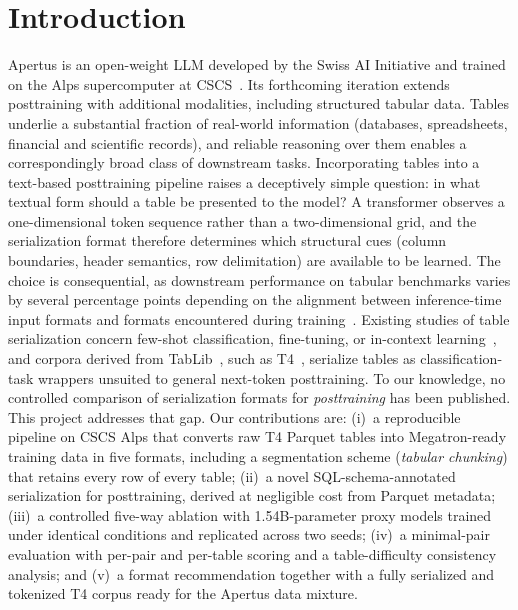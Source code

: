 \documentclass[11pt,a4paper]{article}
\begin{document}
\section{Introduction}
Apertus is an open-weight LLM developed by the Swiss AI Initiative and trained on the Alps supercomputer at CSCS~\cite{apertus}. Its forthcoming iteration extends posttraining with additional modalities, including structured tabular data. Tables underlie a substantial fraction of real-world information (databases, spreadsheets, financial and scientific records), and reliable reasoning over them enables a correspondingly broad class of downstream tasks.
Incorporating tables into a text-based posttraining pipeline raises a deceptively simple question: in what textual form should a table be presented to the model? A transformer observes a one-dimensional token sequence rather than a two-dimensional grid, and the serialization format therefore determines which structural cues (column boundaries, header semantics, row delimitation) are available to be learned. The choice is consequential, as downstream performance on tabular benchmarks varies by several percentage points depending on the alignment between inference-time input formats and formats encountered during training~\cite{wu2025}.
Existing studies of table serialization concern few-shot classification, fine-tuning, or in-context learning~\cite{tabllm,jaitly,wang,ono}, and corpora derived from TabLib~\cite{tablib}, such as T4~\cite{t4}, serialize tables as classification-task wrappers unsuited to general next-token posttraining. To our knowledge, no controlled comparison of serialization formats for \emph{posttraining} has been published. This project addresses that gap. Our contributions are: (i)~a reproducible pipeline on CSCS Alps that converts raw T4 Parquet tables into Megatron-ready training data in five formats, including a segmentation scheme (\emph{tabular chunking}) that retains every row of every table; (ii)~a novel SQL-schema-annotated serialization for posttraining, derived at negligible cost from Parquet metadata; (iii)~a controlled five-way ablation with 1.54B-parameter proxy models trained under identical conditions and replicated across two seeds; (iv)~a minimal-pair evaluation with per-pair and per-table scoring and a table-difficulty consistency analysis; and (v)~a format recommendation together with a fully serialized and tokenized T4 corpus ready for the Apertus data mixture.
\end{document}
